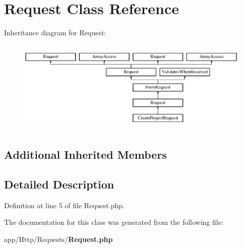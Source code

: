 \section{Request Class Reference}
\label{class_app_1_1_http_1_1_requests_1_1_request}
Inheritance diagram for Request\+:\begin{figure}[H]
\begin{center}
\leavevmode
\includegraphics[height=4.487180cm]{class_app_1_1_http_1_1_requests_1_1_request}
\end{center}
\end{figure}
\subsection*{Additional Inherited Members}


\subsection{Detailed Description}


Definition at line 5 of file Request.\+php.



The documentation for this class was generated from the following file\+:\begin{DoxyCompactItemize}
\item 
app/\+Http/\+Requests/{\bf Request.\+php}\end{DoxyCompactItemize}
